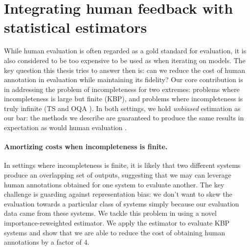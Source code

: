 
\section{Integrating human feedback with statistical estimators}
While human evaluation is often regarded as a gold standard for evaluation, it is also considered to be too expensive to be used as when iterating on models.
The key question this thesis tries to answer then is: can we reduce the cost of human annotation in evaluation while maintaining its fidelity?
Our core contribution is in addressing the problem of incompleteness for two extremes: problems where incompleteness is large but finite (KBP), and problems where incompleteness is truly infinite (TS and OQA ).
In both settings, we hold \textit{unbiased} estimation as our bar: the methods we describe are guaranteed to produce the same results in expectation as would human evaluation .

\paragraph{Amortizing costs when incompleteness is finite.}
In settings where incompleteness is finite, it is likely that two different systems produce an overlapping set of outputs, suggesting that we may can leverage human annotations obtained for one system to evaluate another.
The key challenge is guarding against representation  bias: we don't want to skew the evaluation towards a particular class of systems simply because our evaluation data came from these systems.
We tackle this problem in  using a novel importance-reweighted estimator. We apply the estimator to evaluate KBP systems and show that we are able to reduce the cost of obtaining human annotations by a factor of 4.

